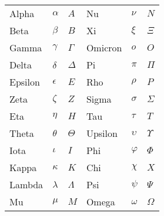 \documentclass[../../../include/open-logic-chapter]{subfiles}
\begin{document}

\begin{center}
    \begin{tabular}{lll@{\qquad}lll}
    Alpha &	$\alpha$ & $A$ &
    Nu & $\nu$ & $N$ \\
    Beta & $\beta$ & $B$ &
    Xi & $\xi$ & $\Xi$ \\
    Gamma &	$\gamma$ & $\Gamma$ &
    Omicron & $o$ & $O$ \\
    Delta & $\delta$ & $\Delta$ &
    Pi & $\pi$ & $\Pi$ \\
    Epsilon & $\epsilon$ & $E$ &
    Rho & $\rho$ & $P$ \\
    Zeta & $\zeta$ & $Z$ &
    Sigma &	$\sigma$ & $\Sigma$ \\
    Eta & $\eta$ & $H$ &
    Tau & $\tau$ & $T$ \\
    Theta & $\theta$ & $\Theta$ &
    Upsilon & $\upsilon$ & $\Upsilon$ \\
    Iota & $\iota$ & $I$ &
    Phi & $\varphi$ & $\Phi$ \\
    Kappa & $\kappa$ & $K$ &
    Chi & $\chi$ & $X$ \\
    Lambda & $\lambda$ & $\Lambda$ &
    Psi & $\psi$ & $\Psi$ \\
    Mu & $\mu$ & $M$ &
    Omega & $\omega$ & $\Omega$
    \end{tabular}
    \end{center}
    
\end{document}
